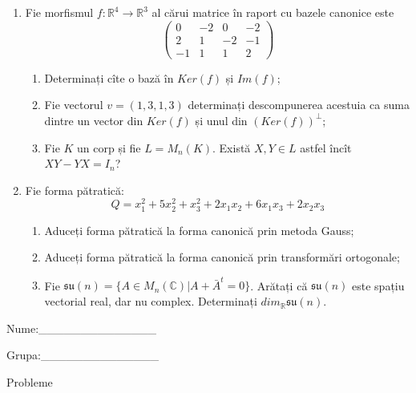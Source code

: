 \documentclass{article}
\begin{document}
\begin{enumerate}
 \item Fie morfismul $f:\mathbb{R}^4 \to \mathbb{R}^3$ al cărui matrice în raport cu bazele canonice este
$$\begin{pmatrix}
0&-2&0&-2\\
2&1&-2&-1\\
-1&1&1&2
\end{pmatrix}$$

\begin{enumerate}
\item Determinați cîte o bază în $Ker(f)$ și $Im(f)$;
\item Fie vectorul $v=(1,3,1,3)$ determinați descompunerea acestuia ca suma dintre un vector din $Ker(f)$ și unul din $(Ker(f))^\perp$;
\item Fie $K$ un corp și fie $L=M_n(K)$. Există $X,Y \in L$ astfel încît $XY-YX=I_n$?  
\end{enumerate}
\item Fie forma pătratică:
$$Q= x_1^2+5x_2^2+x_3^2+2x_1x_2+6x_1x_3+2x_2x_3$$

\begin{enumerate}
\item Aduceți forma pătratică la forma canonică prin metoda Gauss;
\item Aduceți forma pătratică la forma canonică prin transformări ortogonale;
\item Fie $\mathfrak{su}(n)=\{ A \in M_n(\mathbb{C}) | A+\bar{A}^t=0\}$. Arătați că $\mathfrak{su}(n)$ este spațiu vectorial real, dar nu complex.
Determinați $dim_{\mathbb{R}}\mathfrak{su}(n)$.
\end{enumerate}
\end{enumerate}
\newpage
\begin{flushright}
Nume:\_\_\_\_\_\_\_\_\_\_\_\_\_\_
 
 
Grupa:\_\_\_\_\_\_\_\_\_\_\_\_\_\_
\end{flushright}
\begin{center}
\vspace{2cm}
{\Large Probleme}
\vspace{2cm}
\end{center}
\end{document}
